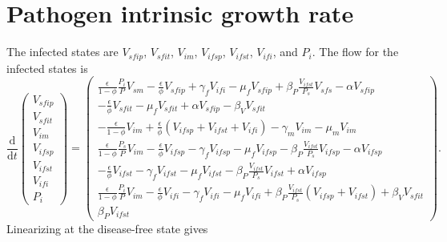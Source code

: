 \documentclass{article}
\newcommand{\md}{\mathrm{d}}
\begin{document}
\section{Pathogen intrinsic growth rate}

The infected states are $V_{sfip}$, $V_{sfit}$, $V_{im}$, $V_{ifsp}$,
$V_{ifst}$, $V_{ifi}$, and $P_i$.
The flow for the infected states is
\begin{equation}
  \frac{\md}{\md t}
  \begin{pmatrix}
    V_{sfip}
    \\
    V_{sfit}
    \\
    V_{im}
    \\
    V_{ifsp}
    \\
    V_{ifst}
    \\
    V_{ifi}
    \\
    P_i
  \end{pmatrix}
  =
  \begin{pmatrix}
    \frac{\epsilon}{1 - \phi} \frac{P_i}{P} V_{sm}
    - \frac{\epsilon}{\phi} V_{sfip}
    + \gamma_f V_{ifi}
    - \mu_f V_{sfip}
    + \beta_P \frac{V_{ifst}}{P_s} V_{sfs}
    - \alpha V_{sfip}
    \\
    - \frac{\epsilon}{\phi} V_{sfit}
    - \mu_f V_{sfit}
    + \alpha V_{sfip}
    - \beta_V V_{sfit}
    \\
    - \frac{\epsilon}{1 - \phi} V_{im}
    + \frac{\epsilon}{\phi} (V_{ifsp} + V_{ifst} + V_{ifi})
    - \gamma_m V_{im}
    - \mu_m V_{im}
    \\
    \frac{\epsilon}{1 - \phi} \frac{P_s}{P} V_{im}
    - \frac{\epsilon}{\phi} V_{ifsp}
    - \gamma_f V_{ifsp}
    - \mu_f V_{ifsp}
    - \beta_P \frac{V_{ifst}}{P_s} V_{ifsp}
    - \alpha V_{ifsp}
    \\
    - \frac{\epsilon}{\phi} V_{ifst}
    - \gamma_f V_{ifst}
    - \mu_f V_{ifst}
    - \beta_P \frac{V_{ifst}}{P_s} V_{ifst}
    + \alpha V_{ifsp}
    \\
    \frac{\epsilon}{1 - \phi} \frac{P_i}{P} V_{im}
    - \frac{\epsilon}{\phi} V_{ifi}
    - \gamma_f V_{ifi}
    - \mu_f V_{ifi}
    + \beta_P \frac{V_{ifst}}{P_s} (V_{ifsp} + V_{ifst})
    + \beta_V V_{sfit}
    \\
    \beta_P V_{ifst}
  \end{pmatrix}.
\end{equation}
Linearizing at the disease-free state gives
\begingroup\makeatletter\def\f@size{4.5}\check@mathfonts
\def\maketag@@@#1{\hbox{\m@th\normalsize\normalfont#1}}
\end{document}
